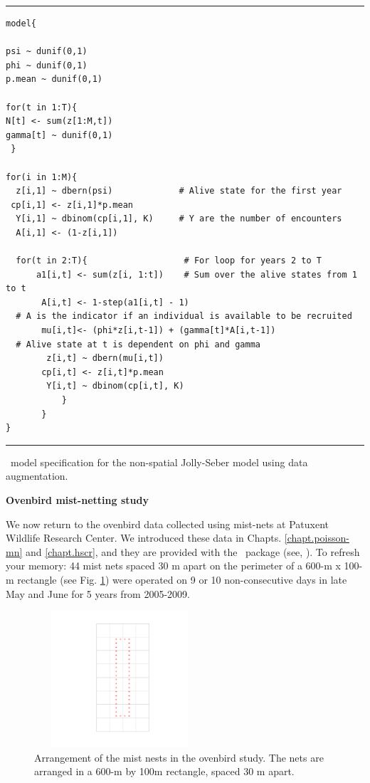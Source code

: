 \begin{panel}[htp]
\centering
\rule[0.1in]{\textwidth}{.03in}
{\small
\begin{verbatim}
model{

psi ~ dunif(0,1)
phi ~ dunif(0,1)
p.mean ~ dunif(0,1)

for(t in 1:T){
N[t] <- sum(z[1:M,t])
gamma[t] ~ dunif(0,1)
 }

for(i in 1:M){
  z[i,1] ~ dbern(psi)	          # Alive state for the first year
 cp[i,1] <- z[i,1]*p.mean
  Y[i,1] ~ dbinom(cp[i,1], K)     # Y are the number of encounters
  A[i,1] <- (1-z[i,1])

  for(t in 2:T){                   # For loop for years 2 to T
      a1[i,t] <- sum(z[i, 1:t])    # Sum over the alive states from 1 to t
       A[i,t] <- 1-step(a1[i,t] - 1)  
  # A is the indicator if an individual is available to be recruited
       mu[i,t]<- (phi*z[i,t-1]) + (gamma[t]*A[i,t-1])
  # Alive state at t is dependent on phi and gamma
        z[i,t] ~ dbern(mu[i,t])   
       cp[i,t] <- z[i,t]*p.mean
        Y[i,t] ~ dbinom(cp[i,t], K)
           }  
       } 
} 
\end{verbatim}
}

\rule[-0.1in]{\textwidth}{.03in}
\caption{
\jags~model specification for the non-spatial Jolly-Seber model using
data augmentation. }
\label{open.panel.nsJS}
\end{panel}


{\flushleft \bf Ovenbird mist-netting study}

We now return to the ovenbird data collected using mist-nets at
Patuxent Wildlife Research Center. We introduced these data 
 in Chapts. \ref{chapt.poisson-mn} and \ref{chapt.hscr}, and they are provided with the 
 \secr~package (see, \citet{efford_etal:2004,
  borchers_efford:2008}). To refresh your memory: 44 mist nets spaced
30 m apart on the perimeter of a 600-m x 100-m rectangle (see
Fig. \ref{open.figs.ovenbirdlocs}) were operated on 9 or 10 non-consecutive days in late May
and June for 5 years from 2005-2009.

\begin{figure}
\centering
\includegraphics[height=2in,width=2.5in]{Ch16-Open/figs/ovenbirds.pdf}
\caption{Arrangement of the mist nests in the ovenbird study.  The nets are arranged in a 600-m by 100m
rectangle, spaced 30 m apart. }
\label{open.figs.ovenbirdlocs}
\end{figure}


